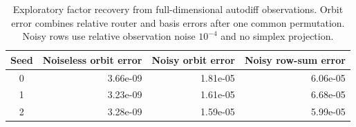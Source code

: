\begin{table}[H]
\centering\small
\caption{Exploratory factor recovery from full-dimensional autodiff observations. Orbit error combines relative router and basis errors after one common permutation. Noisy rows use relative observation noise $10^{-4}$ and no simplex projection.}
\label{tab:factor-recovery}
\begin{tabular}{@{}crrr@{}}
\toprule
Seed & Noiseless orbit error & Noisy orbit error & Noisy row-sum error \\
\midrule
0 & 3.66e-09 & 1.81e-05 & 6.06e-05 \\
1 & 3.23e-09 & 1.61e-05 & 6.68e-05 \\
2 & 3.28e-09 & 1.59e-05 & 5.99e-05 \\
\bottomrule
\end{tabular}
\end{table}
